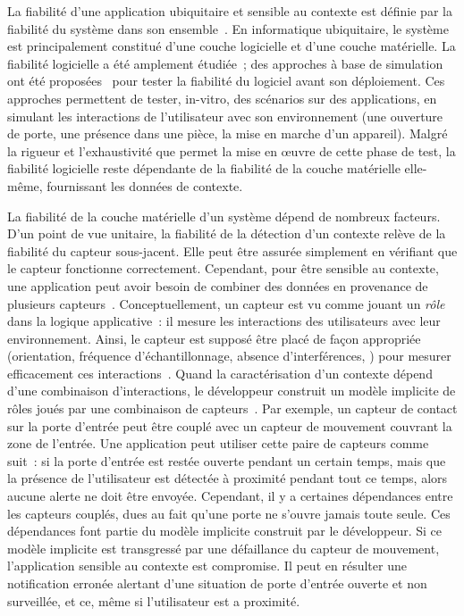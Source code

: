 La fiabilité d'une application ubiquitaire et sensible au contexte est définie 
par la fiabilité du système dans son 
ensemble~. 
En informatique ubiquitaire, le système est principalement constitué d'une 
couche logicielle et d'une couche matérielle. 
La fiabilité logicielle a été amplement étudiée~; des approches à base de 
simulation ont été proposées~ pour tester la 
fiabilité du logiciel avant son déploiement. Ces approches permettent de tester,
in-vitro, des scénarios sur des applications, en simulant les interactions de 
l'utilisateur avec son environnement (\eg une ouverture de porte, une présence 
dans une pièce, la mise en marche d'un appareil). Malgré la rigueur et 
l'exhaustivité que permet la mise en {\oe}uvre de cette phase de test, la 
fiabilité logicielle reste dépendante de la fiabilité de la couche matérielle 
elle-même, fournissant les données de contexte.

La fiabilité de la couche matérielle d'un système dépend de nombreux facteurs. 
D'un point de vue unitaire, la fiabilité de la détection d'un contexte relève de la fiabilité du capteur sous-jacent. 
Elle peut être assurée simplement en vérifiant que le capteur fonctionne 
correctement. Cependant, pour être sensible au contexte, une application 
peut avoir besoin de combiner des données en provenance de plusieurs 
capteurs~. Conceptuellement, un 
capteur est vu comme jouant un {\em rôle} dans la logique applicative~: il mesure 
les interactions des utilisateurs avec leur environnement. Ainsi, le capteur est 
supposé être placé de façon appropriée (orientation, fréquence d'échantillonnage, absence d'interférences, \etc) 
pour mesurer efficacement ces 
interactions~. 
Quand la caractérisation d'un contexte dépend d'une combinaison d'interactions, 
le développeur construit un modèle implicite de rôles %
joués par une combinaison de capteurs~. 
Par exemple, un capteur de contact sur la porte d'entrée peut
être couplé avec un capteur de mouvement couvrant la zone de l'entrée. 
Une application peut utiliser cette paire de capteurs comme suit~: si la 
porte d'entrée est restée ouverte pendant un certain temps, mais que la présence de l'utilisateur est détectée 
à proximité pendant tout ce temps, alors aucune alerte ne doit être envoyée. Cependant, il y a
certaines dépendances entre les capteurs couplés, dues au fait qu'une porte ne
s'ouvre jamais toute seule. Ces dépendances font partie du modèle implicite construit
par le développeur. Si ce modèle implicite 
est transgressé par une défaillance du capteur de mouvement, l'application 
sensible au contexte est compromise. Il peut en résulter une notification erronée 
alertant d'une situation de porte d'entrée ouverte et non surveillée, et ce, 
même si l'utilisateur est a proximité.

